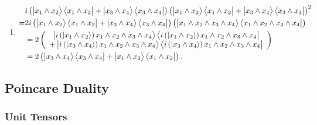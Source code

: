 \documentclass[aps,preprint]{revtex4}%
\begin{document}
\begin{enumerate}
\item
\begin{align}
&  i\left(  \left\vert \overset{}{x_{1}\wedge x_{2}}\right\rangle \left\langle
\overset{}{x_{1}\wedge x_{2}}\right\vert +\left\vert \overset{}{x_{3}\wedge
x_{4}}\right\rangle \left\langle \overset{}{x_{3}\wedge x_{4}}\right\vert
\right)  \left(  \left\vert \overset{}{x_{1}\wedge x_{2}}\right\rangle
\left\langle \overset{}{x_{1}\wedge x_{2}}\right\vert +\left\vert
\overset{}{x_{3}\wedge x_{4}}\right\rangle \left\langle \overset{}{x_{3}\wedge
x_{4}}\right\vert \right)  ^{2\cdot}\\
=  &  2i\left(  \left\vert \overset{}{x_{1}\wedge x_{2}}\right\rangle
\left\langle \overset{}{x_{1}\wedge x_{2}}\right\vert +\left\vert
\overset{}{x_{3}\wedge x_{4}}\right\rangle \left\langle \overset{}{x_{3}\wedge
x_{4}}\right\vert \right)  \left(  \left\vert \overset{}{x_{1}\wedge
x_{2}\wedge x_{3}\wedge x_{4}}\right\rangle \left\langle \overset{}{x_{1}%
\wedge x_{2}\wedge x_{3}\wedge x_{4}}\right\vert \right) \\
&  =2\left(
\begin{array}
[c]{c}%
\left\vert i\left(  \left\vert x_{1}\wedge x_{2}\right\rangle \right)
\overset{}{x_{1}\wedge x_{2}\wedge x_{3}\wedge x_{4}}\right\rangle
\left\langle i\left(  \left\vert x_{1}\wedge x_{2}\right\rangle \right)
\overset{}{x_{1}\wedge x_{2}\wedge x_{3}\wedge x_{4}}\right\vert \\
+\left\vert i\left(  \left\vert x_{3}\wedge x_{4}\right\rangle \right)
\overset{}{x_{1}\wedge x_{2}\wedge x_{3}\wedge x_{4}}\right\rangle
\left\langle i\left(  \left\vert x_{3}\wedge x_{4}\right\rangle \right)
\overset{}{x_{1}\wedge x_{2}\wedge x_{3}\wedge x_{4}}\right\vert
\end{array}
\right) \\
&  =2\left(  \left\vert \overset{}{x_{3}\wedge x_{4}}\right\rangle
\left\langle \overset{}{x_{3}\wedge x_{4}}\right\vert +\left\vert
\overset{}{x_{1}\wedge x_{2}}\right\rangle \left\langle \overset{}{x_{1}\wedge
x_{2}}\right\vert \right)  .
\end{align}

\end{enumerate}

\subsection{Poincare Duality}

\subsubsection{Unit Tensors}
\end{document}

